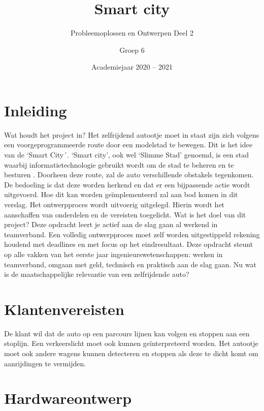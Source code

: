 \documentclass[a4paper,twoside,kulak]{kulakreport} %
\title{Smart city}
\subtitle{Probleemoplossen en Ontwerpen Deel 2}
\author{Groep 6}
\institute {Barbier Jolien, Bossuyt Mathis, De Meester Sarah,
\newline Demuynck Dieter en Jans Rani 
\newline 
o.l.v. Boussé Martijn, Maveau Benjamin en Truyaert Kevin}
\date{Academiejaar 2020 -- 2021}
\begin{document}

\titlepage 
\tableofcontents
\renewcommand\thesection{\arabic{section}}
\renewcommand\thesubsection{\thesection.\arabic{subsection}}
\newpage
\section*{Inleiding}\label{Inleiding}

Wat houdt het project in? Het zelfrijdend autootje moet in staat zijn zich volgens een voorgeprogrammeerde route door een modelstad te bewegen. Dit is het idee van de `Smart City´. `Smart city', ook wel `Slimme Stad' genoemd, is een stad waarbij informatietechnologie gebruikt wordt om de stad te beheren en te besturen \cite{SmartCity}. Doorheen deze route, zal de auto verschillende obstakels tegenkomen. De bedoeling is dat deze worden herkend en dat er een bijpassende actie wordt uitgevoerd. Hoe dit kan worden geïmplementeerd zal aan bod komen in dit verslag.
Het ontwerpproces wordt uitvoerig uitgelegd. Hierin wordt het aanschaffen van onderdelen en de vereisten toegelicht.
Wat is het doel van dit project? Deze opdracht leert je actief aan de slag gaan al werkend in teamverband. Een volledig ontwerpproces moet zelf worden uitgestippeld  rekening houdend met deadlines en met focus op het eindresultaat. Deze opdracht steunt op alle vakken van het eerste jaar ingenieurswetenschappen: werken in teamverband, omgaan met geld, technisch en praktisch aan de slag gaan.
Nu wat is de maatschappelijke relevantie van een zelfrijdende auto?



\section{Klantenvereisten} \label{Klantenvereisten}
De klant wil dat de auto op een parcours lijnen kan volgen en stoppen aan een stoplijn. Een verkeerslicht moet ook kunnen geïnterpreteerd worden. Het autootje moet ook andere wagens kunnen detecteren en stoppen als deze te dicht komt om aanrijdingen te vermijden.

\section{Hardwareontwerp} \label{Hardwareontwerp}
\end{document}
